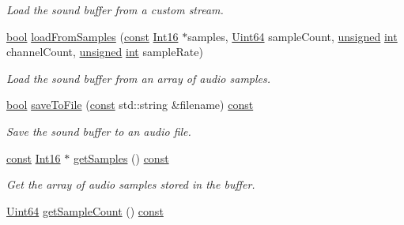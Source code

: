 \begin{DoxyCompactItemize}
\begin{DoxyCompactList}\small\item\em Load the sound buffer from a custom stream. \end{DoxyCompactList}\item 
\hyperlink{term__entry_8h_a002004ba5d663f149f6c38064926abac}{bool} \hyperlink{classsf_1_1_sound_buffer_a42d51ce4bb3b60c7ea06f63c273fd063}{load\-From\-Samples} (\hyperlink{term__entry_8h_a57bd63ce7f9a353488880e3de6692d5a}{const} \hyperlink{namespacesf_a3c8e10435e2a310a7741755e66b5c94e}{Int16} $\ast$samples, \hyperlink{namespacesf_add9ac83466d96b9f50a009b9f4064266}{Uint64} sample\-Count, \hyperlink{curses_8priv_8h_aca40206900cfc164654362fa8d4ad1e6}{unsigned} \hyperlink{term__entry_8h_ad65b480f8c8270356b45a9890f6499ae}{int} channel\-Count, \hyperlink{curses_8priv_8h_aca40206900cfc164654362fa8d4ad1e6}{unsigned} \hyperlink{term__entry_8h_ad65b480f8c8270356b45a9890f6499ae}{int} sample\-Rate)
\begin{DoxyCompactList}\small\item\em Load the sound buffer from an array of audio samples. \end{DoxyCompactList}\item 
\hyperlink{term__entry_8h_a002004ba5d663f149f6c38064926abac}{bool} \hyperlink{classsf_1_1_sound_buffer_ab2083dc1a934c64959d9e3f162328a76}{save\-To\-File} (\hyperlink{term__entry_8h_a57bd63ce7f9a353488880e3de6692d5a}{const} std\-::string \&filename) \hyperlink{term__entry_8h_a57bd63ce7f9a353488880e3de6692d5a}{const} 
\begin{DoxyCompactList}\small\item\em Save the sound buffer to an audio file. \end{DoxyCompactList}\item 
\hyperlink{term__entry_8h_a57bd63ce7f9a353488880e3de6692d5a}{const} \hyperlink{namespacesf_a3c8e10435e2a310a7741755e66b5c94e}{Int16} $\ast$ \hyperlink{classsf_1_1_sound_buffer_a4ba0c1e5b5be500af42de30b1360eb2e}{get\-Samples} () \hyperlink{term__entry_8h_a57bd63ce7f9a353488880e3de6692d5a}{const} 
\begin{DoxyCompactList}\small\item\em Get the array of audio samples stored in the buffer. \end{DoxyCompactList}\item 
\hyperlink{namespacesf_add9ac83466d96b9f50a009b9f4064266}{Uint64} \hyperlink{classsf_1_1_sound_buffer_a2a791e7304553fa96269cc355cc4f7e8}{get\-Sample\-Count} () \hyperlink{term__entry_8h_a57bd63ce7f9a353488880e3de6692d5a}{const} 

\end{DoxyCompactItemize}

